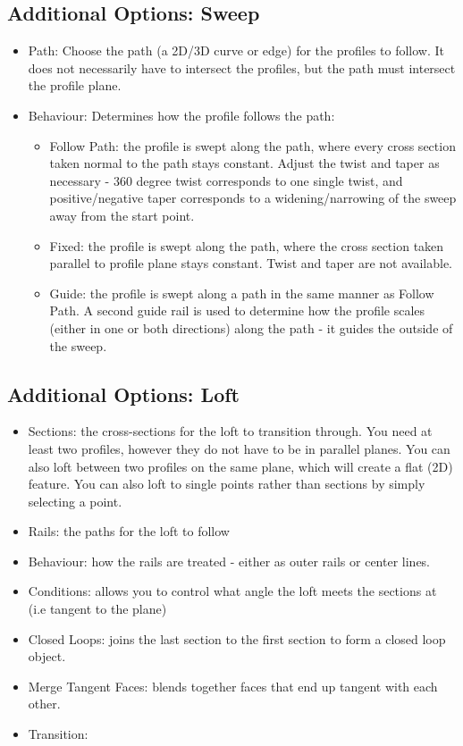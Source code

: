 \subsection{Additional Options: Sweep}

\begin{itemize}
    \item Path: Choose the path (a 2D/3D curve or edge) for the profiles to follow. It does not necessarily have to intersect the profiles, but the path must intersect the profile plane.
    \item Behaviour: Determines how the profile follows the path:
    \begin{itemize}
        \item Follow Path: the profile is swept along the path, where every cross section taken normal to the path stays constant. Adjust the twist and taper as necessary - 360 degree twist corresponds to one single twist, and positive/negative taper corresponds to a widening/narrowing of the sweep away from the start point.
        \item Fixed: the profile is swept along the path, where the cross section taken parallel to profile plane stays constant. Twist and taper are not available.
        \item Guide: the profile is swept along a path in the same manner as Follow Path. A second guide rail is used to determine how the profile scales (either in one or both directions) along the path - it guides the outside of the sweep.
    \end{itemize}
    
\end{itemize}


\subsection{Additional Options: Loft}

\begin{itemize}
    \item Sections: the cross-sections for the loft to transition through. You need at least two profiles, however they do not have to be in parallel planes. You can also loft between two profiles on the same plane, which will create a flat (2D) feature. You can also loft to single points rather than sections by simply selecting a point.
    \item Rails: the paths for the loft to follow
    \item Behaviour: how the rails are treated - either as outer rails or center lines.
    \item Conditions: allows you to control what angle the loft meets the sections at (i.e tangent to the plane)
    \item Closed Loops: joins the last section to the first section to form a closed loop object.
    \item Merge Tangent Faces: blends together faces that end up tangent with each other.
    \item Transition: 

\end{itemize}

